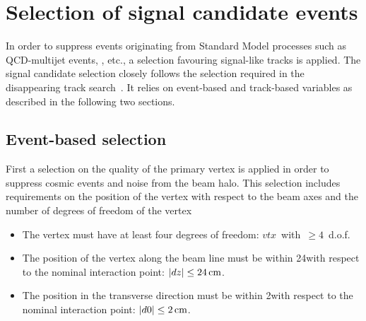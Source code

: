 \section{Selection of signal candidate events}
\label{sec:AnalysisSelection}

In order to suppress events originating from Standard Model processes such as QCD-multijet events, \WJets, etc., a selection favouring signal-like tracks is applied.
The signal candidate selection closely follows the selection required in the disappearing track search~\cite{bib:CMS:DT_Thesis,bib:CMS:DT_8TeV_AN}.
It relies on event-based and track-based variables as described in the following two sections.


\subsection{Event-based selection}
\label{sec:EventBasedSelection}
First a selection on the quality of the primary vertex is applied in order to suppress cosmic events and noise from the beam halo.
This selection includes requirements on the position of the vertex with respect to the beam axes and the number of degrees of freedom of the vertex~\cite{bib:CMS:Tracking_7TeV_PAS} %
\begin{itemize}
\renewcommand{\labelitemi}{\footnotesize{\ding{118}}}
\item The vertex must have at least four degrees of freedom: \mbox{$vtx$ with $\geq 4$ d.o.f.}
\item The position of the vertex along the beam line must be within 24\cm with respect to the nominal interaction point: \mbox{$|dz| \leq 24\,\text{cm}$.}
\item The position in the transverse direction must be within 2\cm with respect to the nominal interaction point: \mbox{$|d0| \leq 2\,\text{cm}$.}\\
\end{itemize}

